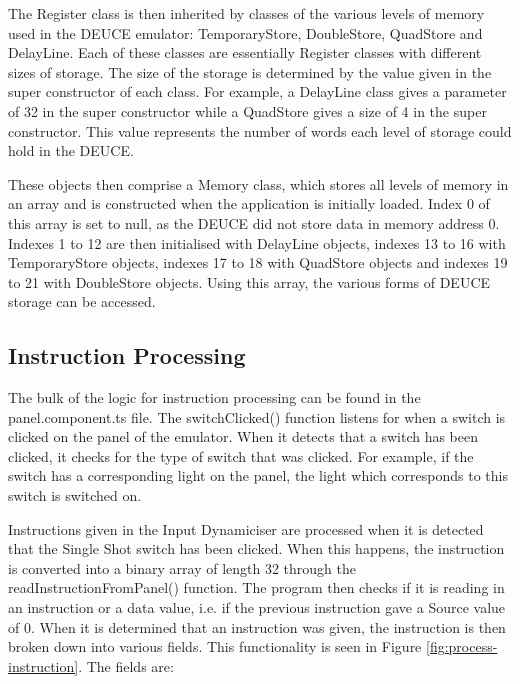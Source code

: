 \documentclass{l4proj}
\begin{document}
The Register class is then inherited by classes of the various levels of memory used in the DEUCE emulator: TemporaryStore, DoubleStore, QuadStore and DelayLine. Each of these classes are essentially Register classes with different sizes of storage. The size of the storage is determined by the value given in the super constructor of each class. For example, a DelayLine class gives a parameter of 32 in the super constructor while a QuadStore gives a size of 4 in the super constructor. This value represents the number of words each level of storage could hold in the DEUCE.

These objects then comprise a Memory class, which stores all levels of memory in an array and is constructed when the application is initially loaded. Index 0 of this array is set to null, as the DEUCE did not store data in memory address 0. Indexes 1 to 12 are then initialised with DelayLine objects, indexes 13 to 16 with TemporaryStore objects, indexes 17 to 18 with QuadStore objects and indexes 19 to 21 with DoubleStore objects. Using this array, the various forms of DEUCE storage can be accessed.

\subsection{Instruction Processing}
The bulk of the logic for instruction processing can be found in the panel.component.ts file. The switchClicked() function listens for when a switch is clicked on the panel of the emulator. When it detects that a switch has been clicked, it checks for the type of switch that was clicked. For example, if the switch has a corresponding light on the panel, the light which corresponds to this switch is switched on. 

Instructions given in the Input Dynamiciser are processed when it is detected that the Single Shot switch has been clicked. When this happens, the instruction is converted into a binary array of length 32 through the readInstructionFromPanel() function. The program then checks if it is reading in an instruction or a data value, i.e. if the previous instruction gave a Source value of 0. When it is determined that an instruction was given, the instruction is then broken down into various fields. This functionality is seen in Figure \ref{fig:process-instruction}. The fields are:
\end{document}
